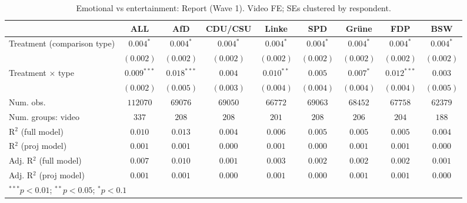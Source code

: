 
\begin{table}
\begin{center}
\begin{tabular}{l c c c c c c c c}
\hline
 & ALL & AfD & CDU/CSU & Linke & SPD & Grüne & FDP & BSW \\
\hline
Treatment (comparison type) & $0.004^{*}$   & $0.004^{*}$   & $0.004^{*}$ & $0.004^{*}$  & $0.004^{*}$ & $0.004^{*}$ & $0.004^{*}$   & $0.004^{*}$ \\
                            & $(0.002)$     & $(0.002)$     & $(0.002)$   & $(0.002)$    & $(0.002)$   & $(0.002)$   & $(0.002)$     & $(0.002)$   \\
Treatment × type            & $0.009^{***}$ & $0.018^{***}$ & $0.004$     & $0.010^{**}$ & $0.005$     & $0.007^{*}$ & $0.012^{***}$ & $0.003$     \\
                            & $(0.002)$     & $(0.005)$     & $(0.003)$   & $(0.004)$    & $(0.004)$   & $(0.004)$   & $(0.004)$     & $(0.005)$   \\
\hline
Num. obs.                   & $112070$      & $69076$       & $69050$     & $66772$      & $69063$     & $68452$     & $67758$       & $62379$     \\
Num. groups: video          & $337$         & $208$         & $208$       & $201$        & $208$       & $206$       & $204$         & $188$       \\
R$^2$ (full model)          & $0.010$       & $0.013$       & $0.004$     & $0.006$      & $0.005$     & $0.005$     & $0.005$       & $0.004$     \\
R$^2$ (proj model)          & $0.001$       & $0.001$       & $0.000$     & $0.001$      & $0.000$     & $0.001$     & $0.001$       & $0.000$     \\
Adj. R$^2$ (full model)     & $0.007$       & $0.010$       & $0.001$     & $0.003$      & $0.002$     & $0.002$     & $0.002$       & $0.001$     \\
Adj. R$^2$ (proj model)     & $0.001$       & $0.001$       & $0.000$     & $0.001$      & $0.000$     & $0.001$     & $0.001$       & $0.000$     \\
\hline
\multicolumn{9}{l}{\scriptsize{$^{***}p<0.01$; $^{**}p<0.05$; $^{*}p<0.1$}}
\end{tabular}
\caption{Emotional vs entertainment: Report (Wave 1). Video FE; SEs clustered by respondent.}
\label{tab:compare_emotional_vs_entertainment_report}
\end{center}
\end{table}

